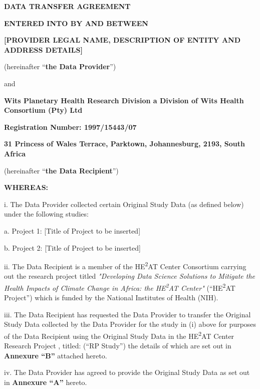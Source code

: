 \vspace{1cm}

\textbf{DATA TRANSFER AGREEMENT}

\textbf{ENTERED INTO BY AND BETWEEN}

\textbf{[PROVIDER LEGAL NAME, DESCRIPTION OF ENTITY AND ADDRESS DETAILS]}

(hereinafter ``\textbf{the Data Provider}'')

and

\textbf{Wits Planetary Health Research Division a Division of Wits Health Consortium (Pty) Ltd}

\textbf{Registration Number: 1997/15443/07}

\textbf{31 Princess of Wales Terrace, Parktown, Johannesburg, 2193, South Africa}

(hereinafter ``\textbf{the Data Recipient}'')

\textbf{WHEREAS:}

i. The Data Provider collected certain Original Study Data (as defined below) under the following studies:

a. Project 1: [Title of Project to be inserted]

b. Project 2: [Title of Project to be inserted]

ii. The Data Recipient is a member of the HE\textsuperscript{2}AT Center Consortium carrying out the research project titled \textit{"Developing Data Science Solutions to Mitigate the Health Impacts of Climate Change in Africa: the HE\textsuperscript{2}AT Center"} (``HE\textsuperscript{2}AT Project'') which is funded by the National Institutes of Health (NIH).

iii. The Data Recipient has requested the Data Provider to transfer the Original Study Data collected by the Data Provider for the study in (i) above for purposes of the Data Recipient using the Original Study Data in the HE\textsuperscript{2}AT Center Research Project , titled:  (``RP Study'') the details of which are set out in \textbf{Annexure ``B''} attached hereto.

iv. The Data Provider has agreed to provide the Original Study Data as set out in \textbf{Annexure ``A''} hereto.

